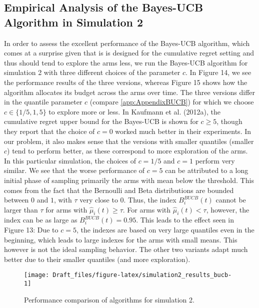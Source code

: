\documentclass[11pt,]{article}
\begin{document}
\DecMargin{1em}

\subsection{Empirical Analysis of the Bayes-UCB Algorithm in Simulation
2}\label{empirical-analysis-of-the-bayes-ucb-algorithm-in-simulation-2}

In order to assess the excellent performance of the Bayes-UCB algorithm,
which comes at a surprise given that is is designed for the cumulative
regret setting and thus should tend to explore the arms less, we run the
Bayes-UCB algorithm for simulation 2 with three different choices of the
parameter \(c\). In Figure 14, we see the performance results of the
three versions, whereas Figure 15 shows how the algorithm allocates its
budget across the arms over time. The three versions differ in the
quantile parameter \(c\) (compare \autoref{app:AppendixBUCB}) for which
we choose \(c \in \{1/5, 1, 5\}\) to explore more or less. In Kaufmann
et al. (2012a), the cumulative regret upper bound for the Bayes-UCB is
shown for \(c\geq 5\), though they report that the choice of \(c=0\)
worked much better in their experiments. In our problem, it also makes
sense that the versions with smaller quantiles (smaller \(c\)) tend to
perform better, as these correspond to more exploration of the arms. In
this particular simulation, the choices of \(c=1/5\) and \(c=1\) perform
very similar. We see that the worse performance of \(c=5\) can be
attributed to a long initial phase of sampling primarily the arms with
mean below the threshold. This comes from the fact that the Bernoulli
and Beta distributions are bounded between \(0\) and \(1\), with
\(\tau\) very close to \(0\). Thus, the index \(B_i^{BUCB}(t)\) cannot
be larger than \(\tau\) for arms with \(\hat{\mu}_i(t) \geq \tau\). For
arms with \(\hat{\mu}_i(t) < \tau\), however, the index can be as large
as \(B_i^{BUCB}(t) = 0.95\). This leads to the effect seen in Figure 13:
Due to \(c=5\), the indexes are based on very large quantiles even in
the beginning, which leads to large indexes for the arms with small
means. This however is not the ideal sampling behavior. The other two
variants adapt much better due to their smaller quantiles (and more
exploration).

\begin{figure}

{\centering \texttt{[image: Draft\_files/figure-latex/simulation2\_results\_bucb-1]} 

}

\caption{Performance comparison of algorithms for simulation 2.}\label{fig:simulation2_results_bucb}
\end{figure}
\end{document}
